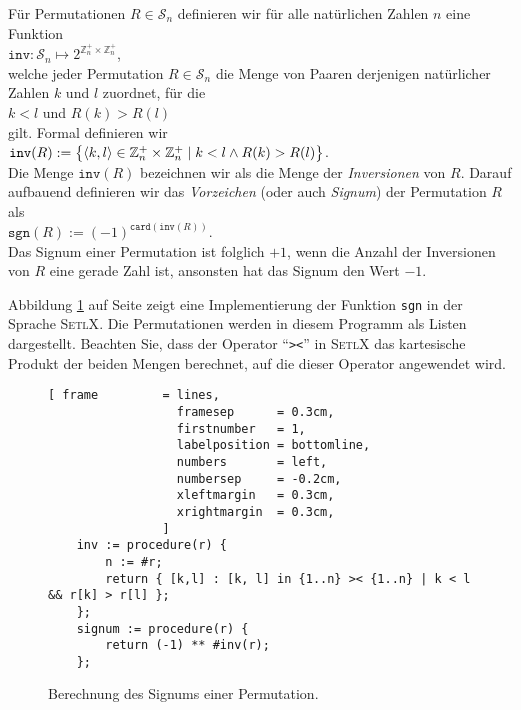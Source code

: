 \begin{Definition}[Signum]
  F\"ur Permutationen $R \in \mathcal{S}_n$ definieren wir f\"ur alle nat\"urlichen Zahlen $n$ eine Funktion
  \\[0.2cm]
  \hspace*{1.3cm}
  $\mathtt{inv} : \mathcal{S}_n \mapsto 2^{\mathbb{Z}_n^+ \times \mathbb{Z}_n^+}$,
  \\[0.2cm]
  welche jeder Permutation $R \in \mathcal{S}_n$ die Menge von Paaren derjenigen nat\"urlicher Zahlen $k$ und $l$
  zuordnet, f\"ur die
  \\[0.2cm]
  \hspace*{1.3cm}
  $k < l$ \quad und \quad $R(k) > R(l)$
  \\[0.2cm]
  gilt.  Formal definieren wir
  \\[0.2cm]
  \hspace*{1.3cm}
  $\mathtt{inv}(R) := \bigl\{ \pair(k,l) \in \mathbb{Z}_n^+ \times \mathbb{Z}_n^+ \mid k < l \wedge  R(k) > R(l) \bigr\}$.
  \\[0.2cm]
  Die Menge $\mathtt{inv}(R)$ bezeichnen wir als die Menge der \emph{Inversionen} von $R$.
  Darauf aufbauend definieren wir das \emph{Vorzeichen} (oder auch \emph{Signum}) der Permutation
  $R$ als 
  \\[0.2cm]
  \hspace*{1.3cm}
  $\mathtt{sgn}(R) := (-1)^{\mathtt{card}(\mathtt{inv}(R))}$.
  \\[0.2cm]
  Das Signum einer Permutation ist folglich $+1$, wenn die Anzahl der Inversionen von $R$ eine gerade
  Zahl ist, ansonsten hat das Signum den Wert $-1$.  \eox
\end{Definition}


Abbildung \ref{fig:signum.stlx} auf Seite \pageref{fig:signum.stlx} zeigt eine Implementierung der
Funktion \texttt{sgn} in der Sprache \textsc{SetlX}.  Die Permutationen werden in diesem Programm
als Listen dargestellt.  Beachten Sie, dass der Operator ``\texttt{><}'' in \textsc{SetlX} das
kartesische Produkt der beiden Mengen berechnet, auf die dieser Operator angewendet wird.


\begin{figure}[!ht]
\centering
\begin{Verbatim}[ frame         = lines, 
                  framesep      = 0.3cm, 
                  firstnumber   = 1,
                  labelposition = bottomline,
                  numbers       = left,
                  numbersep     = -0.2cm,
                  xleftmargin   = 0.3cm,
                  xrightmargin  = 0.3cm,
                ]
    inv := procedure(r) {
        n := #r;
        return { [k,l] : [k, l] in {1..n} >< {1..n} | k < l && r[k] > r[l] };
    };
    signum := procedure(r) {
        return (-1) ** #inv(r);
    };
\end{Verbatim}
\vspace*{-0.3cm}
\caption{Berechnung des Signums einer Permutation.}
\label{fig:signum.stlx}
\end{figure}


